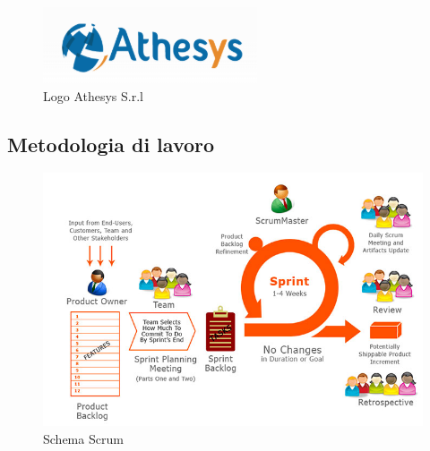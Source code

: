 \begin{figure}[!h]
	\centering
	\includegraphics{immagini/logo_athesys}
	\caption{Logo Athesys S.r.l}
\end{figure}

\subsection{Metodologia di lavoro}

\begin{figure}[!h]
	\centering
	\includegraphics[scale=0.35]{immagini/scrum}
	\caption{Schema Scrum}
\end{figure}

